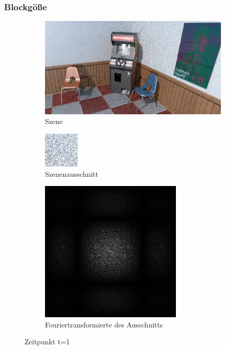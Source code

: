 \label{subsec:Blockgröße}
\subsubsection{Blockgöße}

\newpage

\begin{figure}[H]

    \begin{subfigure}{\textwidth}
        \centering \includegraphics[scale=.25]{content/TemporalerAlg/Bilder/Sorting/Screenshots/seed_debug_3.0_selection.png}
        \caption{Szene}
        \label{fig:Nur_Sorting_Szene_t1}
    \end{subfigure}
    \begin{subfigure}{0.5\textwidth}
        \centering \includegraphics[width=0.4\linewidth]{content/TemporalerAlg/Bilder/Sorting/Screenshots/seed_debug_3.0_ausschnitt.png} 
        \caption{Szenenausschnitt}
        \label{fig:Nur_Sorting_ausschnitt_t1}
    \end{subfigure}
    \begin{subfigure}{0.5\textwidth}
        \centering \includegraphics[width=0.4\linewidth]{content/TemporalerAlg/Bilder/Sorting/Screenshots/Spektren/seed_debug_3.0_ausschnitt.png}
        \caption{Fouriertransformierte des Ausschnitts}
        \label{fig:Nur_Sorting_Fouriertransformierte_t1}
    \end{subfigure}
        \caption{Zeitpunkt t=1}
        \label{fig:Nur_Sorting_Verlauf_t1}
\end{figure}

